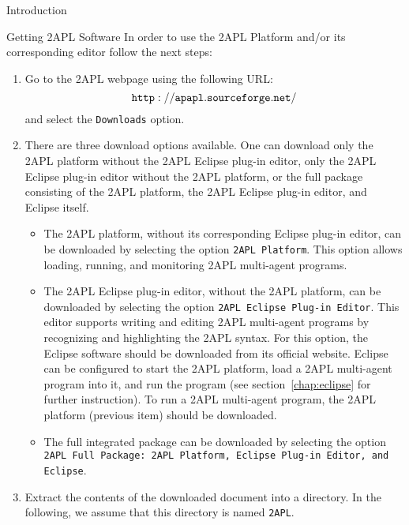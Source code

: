 \begin{chapter}{Introduction}
\begin{section}{Getting 2APL Software}
In order to use the 2APL Platform and/or its corresponding editor
follow the next steps:
\begin{enumerate}
    \item Go to the 2APL webpage using the following URL:
          $${\tt http://apapl.sourceforge.net/}$$
          and select the {\tt Downloads} option.

    \item There are three download options available. One can download
          only the 2APL platform without the 2APL Eclipse plug-in editor,
          only the 2APL Eclipse plug-in editor without the 2APL platform, or
          the full package consisting of the 2APL platform, the 2APL Eclipse plug-in editor,
          and Eclipse itself.
          \begin{itemize}
                \item The 2APL platform, without its corresponding Eclipse plug-in
                editor, can be downloaded by selecting the option {\tt 2APL
                Platform}. This option allows loading, running, and
                monitoring 2APL multi-agent programs.
                \item The 2APL Eclipse plug-in editor, without the 2APL
                platform, can be downloaded by selecting the option
                {\tt 2APL Eclipse Plug-in Editor}. This editor
                supports writing and editing 2APL multi-agent programs by recognizing and highlighting the 2APL syntax.
                For this option, the Eclipse software should be downloaded from its official website.
                Eclipse can be configured to start the 2APL platform, load a 2APL multi-agent program into
                it, and run the program (see section~\ref{chap:eclipse} for further
                instruction). To run a 2APL multi-agent program, the
                2APL platform (previous item) should be downloaded.
                \item The full integrated package can be downloaded by
                selecting the option {\tt 2APL Full Package: 2APL Platform, Eclipse Plug-in Editor, and
                Eclipse}.
          \end{itemize}
    \item Extract the contents of the downloaded document into a
          directory. In the following, we assume that this directory is
          named {\tt 2APL}.
\end{enumerate}


\end{section}
\end{chapter}
